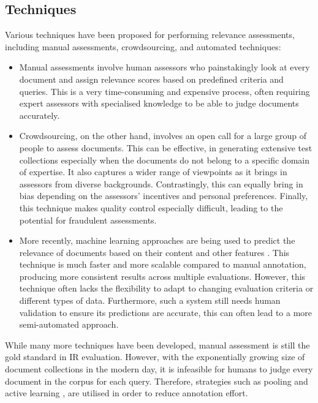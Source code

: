 \documentclass{l4proj}
\begin{document}
\subsection{Techniques}
Various techniques have been proposed for performing relevance assessments, including manual assessments, crowdsourcing, and automated techniques:
\begin{itemize}
    \item Manual assessments involve human assessors who painstakingly look at every document and assign relevance scores based on predefined criteria and queries. This is a very time-consuming and expensive process, often requiring expert assessors with specialised knowledge to be able to judge documents accurately. 

    \item Crowdsourcing, on the other hand, involves an open call for a large group of people to assess documents. This can be effective, in generating extensive test collections especially when the documents do not belong to a specific domain of expertise. It also captures a wider range of viewpoints as it brings in assessors from diverse backgrounds. Contrastingly, this can equally bring in bias depending on the assessors' incentives and personal preferences. Finally, this technique makes quality control especially difficult, leading to the potential for fraudulent assessments.
    
    \item More recently, machine learning approaches are being used to predict the relevance of documents based on their content and other features \citep{cao2007ltr}. This technique is much faster and more scalable compared to manual annotation, producing more consistent results across multiple evaluations. However, this technique often lacks the flexibility to adapt to changing evaluation criteria or different types of data. Furthermore, such a system still needs human validation to ensure its predictions are accurate, this can often lead to a more semi-automated approach.
\end{itemize}

While many more techniques have been developed, manual assessment is still the gold standard in IR evaluation. However, with the exponentially growing size of document collections in the modern day, it is infeasible for humans to judge every document in the corpus for each query. Therefore, strategies such as pooling and active learning \citep{rahman2020testal}, are utilised in order to reduce annotation effort.
\end{document}
